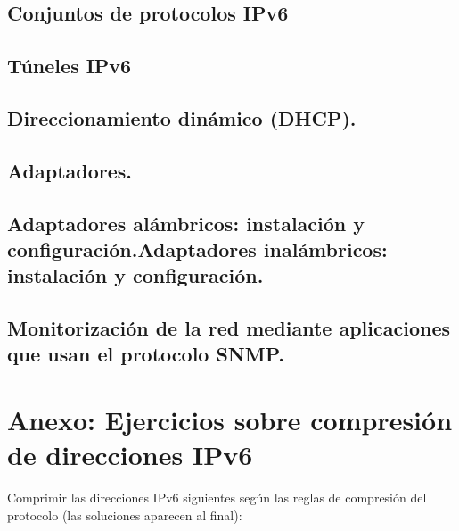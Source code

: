 \documentclass[letterpaper,10pt,spanish]{sphinxmanual}
\begin{document}
\section{Conjuntos de protocolos IPv6}
\label{\detokenize{t2_integracion_elementos/apuntes_t2:conjuntos-de-protocolos-ipv6}}

\section{Túneles IPv6}
\label{\detokenize{t2_integracion_elementos/apuntes_t2:tuneles-ipv6}}

\section{Direccionamiento dinámico (DHCP).}
\label{\detokenize{t2_integracion_elementos/apuntes_t2:direccionamiento-dinamico-dhcp}}

\section{Adaptadores.}
\label{\detokenize{t2_integracion_elementos/apuntes_t2:adaptadores}}

\section{Adaptadores alámbricos: instalación y configuración.Adaptadores inalámbricos: instalación y configuración.}
\label{\detokenize{t2_integracion_elementos/apuntes_t2:adaptadores-alambricos-instalacion-y-configuracion-adaptadores-inalambricos-instalacion-y-configuracion}}

\section{Monitorización de la red mediante aplicaciones que usan el protocolo SNMP.}
\label{\detokenize{t2_integracion_elementos/apuntes_t2:monitorizacion-de-la-red-mediante-aplicaciones-que-usan-el-protocolo-snmp}}

\chapter{Anexo: Ejercicios sobre compresión de direcciones IPv6}
\label{\detokenize{t2_integracion_elementos/apuntes_t2:anexo-ejercicios-sobre-compresion-de-direcciones-ipv6}}
\sphinxAtStartPar
Comprimir las direcciones IPv6 siguientes según las reglas de compresión del protocolo (las soluciones aparecen al final):
\end{document}
